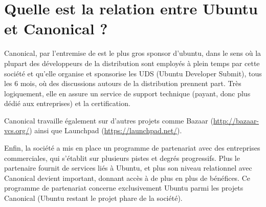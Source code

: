 \section{Quelle est la relation entre Ubuntu et Canonical ?}
Canonical, par l'entremise de  est le plus gros sponsor d'ubuntu, dans le sens où la plupart des développeurs de la distribution sont employés à plein temps par cette société et qu'elle organise et sponsorise les UDS (Ubuntu Developer Submit), tous les 6 mois, où des discussions autours de la distribution prennent part. Très logiquement, elle en assure un service de support technique (payant, donc plus dédié aux entreprises) et la certification.\par
Canonical travaille également sur d'autres projets comme Bazaar (\url{http://bazaar-vcs.org/}) ainsi que Launchpad (\url{https://launchpad.net/}).\par
Enfin, la société a mis en place un programme de partenariat avec des entreprises commerciales, qui s'établit sur plusieurs pistes et degrés progressifs. Plus le partenaire fournit de services liés à Ubuntu, et plus son niveau relationnel avec Canonical devient important, donnant accès à de plus en plus de bénéfices. Ce programme de partenariat concerne exclusivement Ubuntu parmi les projets Canonical (Ubuntu restant le projet phare de la société).
